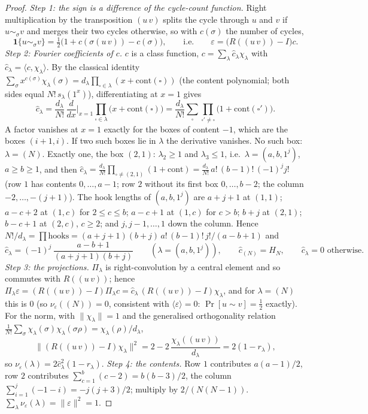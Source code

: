 \begin{proof}
\emph{Step 1: the sign is a difference of the cycle-count function.}
Right multiplication by the transposition $(u\,v)$ splits the cycle
through $u$ and $v$ if $u\sim_\sigma v$ and merges their two cycles
otherwise, so with $c(\sigma)$ the number of cycles,
\[
\mathbf 1\{u\sim_\sigma v\}=\tfrac12\bigl(1+c(\sigma(u\,v))-c(\sigma)\bigr),
\qquad\text{i.e.}\qquad
\varepsilon=\bigl(R((u\,v))-I\bigr)c .
\]
\emph{Step 2: Fourier coefficients of $c$.}  $c$ is a class function,
$c=\sum_\lambda\hat c_\lambda\chi_\lambda$ with
$\hat c_\lambda=\langle c,\chi_\lambda\rangle$.  By the classical
identity $\sum_{\sigma}x^{c(\sigma)}\chi_\lambda(\sigma)
=d_\lambda\prod_{\square\in\lambda}(x+\mathrm{cont}(\square))$
(the content polynomial; both sides equal $N!\,s_\lambda(1^x)$),
differentiating at $x=1$ gives
\[
\hat c_\lambda=\frac{d_\lambda}{N!}\,\frac{d}{dx}\Big|_{x=1}
\prod_{\square\in\lambda}\bigl(x+\mathrm{cont}(\square)\bigr)
=\frac{d_\lambda}{N!}\sum_{\square}\prod_{\square'\ne\square}\bigl(1+\mathrm{cont}(\square')\bigr).
\]
A factor vanishes at $x=1$ exactly for the boxes of content $-1$,
which are the boxes $(i+1,i)$.  If two such boxes lie in $\lambda$ the
derivative vanishes.  No such box: $\lambda=(N)$.  Exactly one, the
box $(2,1)$: $\lambda_2\ge1$ and $\lambda_3\le1$, i.e.\
$\lambda=(a,b,1^j)$, $a\ge b\ge1$, and then
$\hat c_\lambda=\frac{d_\lambda}{N!}\prod_{\square\ne(2,1)}(1+\mathrm{cont})
=\frac{d_\lambda}{N!}\,a!\,(b-1)!\,(-1)^jj!$ (row $1$ has contents
$0,\dots,a-1$; row $2$ without its first box $0,\dots,b-2$; the
column $-2,\dots,-(j+1)$).  The hook lengths of $(a,b,1^j)$ are
$a+j+1$ at $(1,1)$; $a-c+2$ at $(1,c)$ for $2\le c\le b$; $a-c+1$ at
$(1,c)$ for $c>b$; $b+j$ at $(2,1)$; $b-c+1$ at $(2,c)$, $c\ge2$; and
$j,j-1,\dots,1$ down the column.  Hence
$N!/d_\lambda=\prod\text{hooks}=(a+j+1)(b+j)\,a!\,(b-1)!\,j!/(a-b+1)$
and
\[
\hat c_\lambda=(-1)^j\,\frac{a-b+1}{(a+j+1)(b+j)}\qquad(\lambda=(a,b,1^j)),
\qquad \hat c_{(N)}=H_N,\qquad\hat c_\lambda=0\text{ otherwise}.
\]
\emph{Step 3: the projections.}  $\Pi_\lambda$ is right-convolution
by a central element and so commutes with $R((u\,v))$; hence
$\Pi_\lambda\varepsilon=(R((u\,v))-I)\Pi_\lambda c
=\hat c_\lambda\,(R((u\,v))-I)\chi_\lambda$, and for $\lambda=(N)$
this is $0$ (so $\nu_\varepsilon((N))=0$, consistent with
$\langle\varepsilon\rangle=0$: $\Pr[u\sim v]=\tfrac12$ exactly).
For the norm, with $\|\chi_\lambda\|=1$ and the generalised
orthogonality relation
$\frac1{N!}\sum_\sigma\chi_\lambda(\sigma)\chi_\lambda(\sigma\rho)
=\chi_\lambda(\rho)/d_\lambda$,
\[
\|(R((u\,v))-I)\chi_\lambda\|^2
=2-2\,\frac{\chi_\lambda((u\,v))}{d_\lambda}=2(1-r_\lambda),
\]
so $\nu_\varepsilon(\lambda)=2\hat c_\lambda^2(1-r_\lambda)$.
\emph{Step 4: the contents.}  Row $1$ contributes $a(a-1)/2$, row $2$
contributes $\sum_{c=1}^b(c-2)=b(b-3)/2$, the column
$\sum_{i=1}^j(-1-i)=-j(j+3)/2$; multiply by $2/(N(N-1))$.
$\sum_\lambda\nu_\varepsilon(\lambda)=\|\varepsilon\|^2=1$.
\end{proof}

